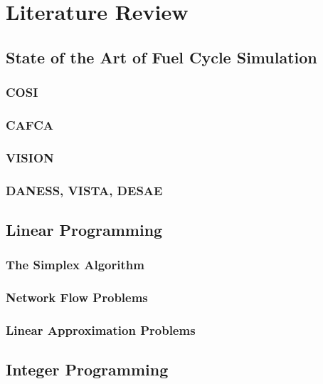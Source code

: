 \chapter{Literature Review}\label{ch:litreview}

\section{State of the Art of Fuel Cycle Simulation}\label{sec:simulators}


\subsection{COSI}\label{sec:cosi}


\subsection{CAFCA}\label{sec:cafca}


\subsection{VISION}\label{sec:vision}


\subsection{DANESS, VISTA, DESAE}\label{sec:other-sims}


\section{Linear Programming}
\label{sec:lp-overview}

\subsection{The Simplex Algorithm}\label{sec:simplex}


\subsection{Network Flow Problems}\label{sec:xportation}


\subsection{Linear Approximation Problems}\label{sec:approx}


\section{Integer Programming}\label{sec:ip}

